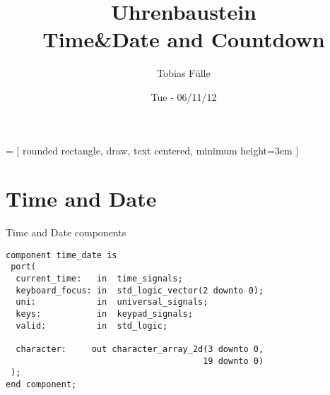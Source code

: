 \documentclass{beamer}
\title[Title of presentation]{Uhrenbaustein\\
{\small Time&Date and Countdown}
}
\author[author name]
{Tobias F{\"u}lle}
\institute[Fnord GmbH]{Lehrstuhl f{\"u}r integrierte Systeme}
\date{Tue - 06/11/12}
\begin{document}
%

   = [ rounded rectangle, 
                        draw, 
                        text centered, 
                        minimum height=3em 
                      ]


\section{Time and Date}
\begin{frame}[fragile]{Time and Date components}
\begin{verbatim} 
component time_date is	
 port(
  current_time:   in  time_signals;
  keyboard_focus: in  std_logic_vector(2 downto 0);
  uni:            in  universal_signals;
  keys:           in  keypad_signals;
  valid:          in  std_logic;
    
  character:     out character_array_2d(3 downto 0,
                                       19 downto 0)
 );
end component;
\end{verbatim}
\end{frame}
\end{document}
